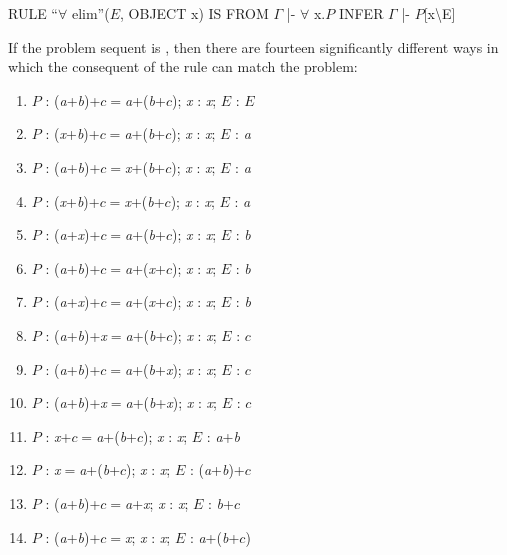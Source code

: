 \begin{japeish}
RULE ``$\forall$ elim''($E$, OBJECT x) IS FROM $\Gamma$ |- $\forall$ x.$P$ INFER $\Gamma$ |- $P$[x\textbackslash E]
\end{japeish}

If the problem sequent is , then there are fourteen significantly different ways in which the consequent of the rule can match the problem:

\begin{enumerate}
\item $P$ : (\textit{a}+\textit{b})+$c$\ensuremath{=}\textit{a}+(\textit{b}+$c$); \textit{x} : \textit{x}; $E$ : $E$
\item $P$ : (\textit{x}+\textit{b})+$c$\ensuremath{=}\textit{a}+(\textit{b}+$c$); \textit{x} : \textit{x}; $E$ : \textit{a}
\item $P$ : (\textit{a}+\textit{b})+$c$\ensuremath{=}\textit{x}+(\textit{b}+$c$); \textit{x} : \textit{x}; $E$ : \textit{a}
\item $P$ : \label{match:a-all}(\textit{x}+\textit{b})+$c$\ensuremath{=}\textit{x}+(\textit{b}+$c$); \textit{x} : \textit{x}; $E$ : \textit{a}
\item $P$ : (\textit{a}+\textit{x})+$c$\ensuremath{=}\textit{a}+(\textit{b}+$c$); \textit{x} : \textit{x}; $E$ : \textit{b}
\item $P$ : (\textit{a}+\textit{b})+$c$\ensuremath{=}\textit{a}+(\textit{x}+$c$); \textit{x} : \textit{x}; $E$ : \textit{b}
\item $P$ : \label{match:b-all}(\textit{a}+\textit{x})+$c$\ensuremath{=}\textit{a}+(\textit{x}+$c$); \textit{x} : \textit{x}; $E$ : \textit{b}
\item $P$ : (\textit{a}+\textit{b})+\textit{x}\ensuremath{=}\textit{a}+(\textit{b}+$c$); \textit{x} : \textit{x}; $E$ : $c$
\item $P$ : (\textit{a}+\textit{b})+$c$\ensuremath{=}\textit{a}+(\textit{b}+\textit{x}); \textit{x} : \textit{x}; $E$ : $c$
\item $P$ : \label{match:c-all}(\textit{a}+\textit{b})+\textit{x}\ensuremath{=}\textit{a}+(\textit{b}+\textit{x}); \textit{x} : \textit{x}; $E$ : $c$
\item $P$ : \label{match:a+b}\textit{x}+$c$\ensuremath{=}\textit{a}+(\textit{b}+$c$); \textit{x} : \textit{x}; $E$ : \textit{a}+\textit{b}
\item $P$ : \label{match:(a+b)+c}\textit{x}\ensuremath{=}\textit{a}+(\textit{b}+$c$); \textit{x} : \textit{x}; $E$ : (\textit{a}+\textit{b})+$c$
\item $P$ : \label{match:b+c}(\textit{a}+\textit{b})+$c$\ensuremath{=}\textit{a}+\textit{x}; \textit{x} : \textit{x}; $E$ : \textit{b}+$c$
\item $P$ : \label{match:a+(b+c)}(\textit{a}+\textit{b})+$c$\ensuremath{=}\textit{x}; \textit{x} : \textit{x}; $E$ : \textit{a}+(\textit{b}+$c$)
\end{enumerate}

